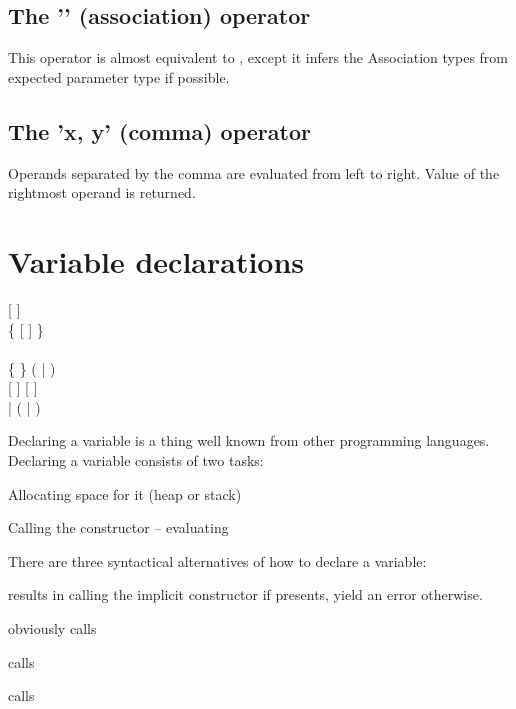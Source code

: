 \subsection{The '' (association) operator}
This operator is almost equivalent to , except it infers the Association types from expected parameter type if possible.

\subsection{The 'x, y' (comma) operator}
Operands separated by the comma are evaluated from left to right. Value of the rightmost operand is returned.

\section{Variable declarations}
\begin{grammar}
	   [  ] \\
		\grLn \{ \kwd{,}  [  ] \} \kwd{;} \\
	\\
	 \{  \} (  |  ) \\
	  [  ] [ \kwd{!} ] \\
	  | ( \kwd{=} | \kwd{:=} )  \\
\end{grammar}

Declaring a variable is a thing well known from other programming languages. Declaring a variable consists of two tasks:
\begin{compactenum}
	\item Allocating space for it (heap or stack)
	\item Calling the constructor -- evaluating 
\end{compactenum}

There are three syntactical alternatives of how to declare a variable:
\begin{compactitem}
	\item {} results in calling the implicit constructor  if presents, yield an error otherwise.
	\item {} obviously calls 
	\item {} calls 
	\item {} calls  %
\end{compactitem}

